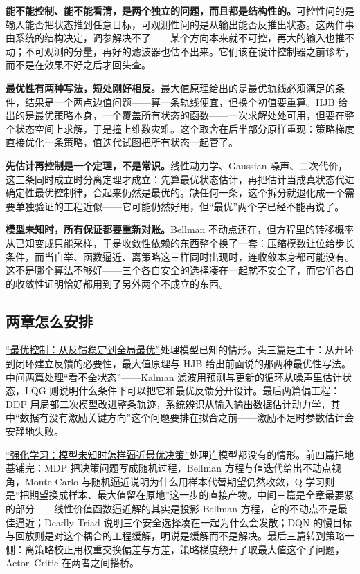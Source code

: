 \textbf{能不能控制、能不能看清，是两个独立的问题，而且都是结构性的。}可控性问的是输入能否把状态推到任意目标，可观测性问的是从输出能否反推出状态。这两件事由系统的结构决定，调参解决不了——某个方向本来就不可控，再大的输入也推不动；不可观测的分量，再好的滤波器也估不出来。它们该在设计控制器之前诊断，而不是在效果不好之后才回头查。

\textbf{最优性有两种写法，短处刚好相反。}最大值原理给出的是最优轨线必须满足的条件，结果是一个两点边值问题——算一条轨线便宜，但换个初值要重算。HJB 给出的是最优策略本身，一个覆盖所有状态的函数——一次求解处处可用，但要在整个状态空间上求解，于是撞上维数灾难。这个取舍在后半部分原样重现：策略梯度直接优化一条策略，值迭代试图把所有状态一起管了。

\textbf{先估计再控制是一个定理，不是常识。}线性动力学、Gaussian 噪声、二次代价，这三条同时成立时分离定理才成立：先算最优状态估计，再把估计当成真状态代进确定性最优控制律，合起来仍然是最优的。缺任何一条，这个拆分就退化成一个需要单独验证的工程近似——它可能仍然好用，但``最优''两个字已经不能再说了。

\textbf{模型未知时，所有保证都要重新对账。}Bellman 不动点还在，但方程里的转移概率从已知变成只能采样，于是收敛性依赖的东西整个换了一套：压缩模数让位给步长条件，而当自举、函数逼近、离策略这三样同时出现时，连收敛本身都可能没有。这不是哪个算法不够好——三个各自安全的选择凑在一起就不安全了，而它们各自的收敛性证明恰好都用到了另外两个不成立的东西。

\subsection{两章怎么安排}

\hyperref[ch:138]{``最优控制：从反馈稳定到全局最优''}处理模型已知的情形。头三篇是主干：从开环到闭环建立反馈的必要性，最大值原理与 HJB 给出前面说的那两种最优性写法。中间两篇处理``看不全状态''——Kalman 滤波用预测与更新的循环从噪声里估计状态，LQG 则说明什么条件下可以把它和最优反馈分开设计。最后两篇偏工程：DDP 用局部二次模型改进整条轨迹，系统辨识从输入输出数据估计动力学，其中``数据有没有激励关键方向''这个问题要排在拟合之前——激励不足时参数估计会安静地失败。

\hyperref[ch:139]{``强化学习：模型未知时怎样逼近最优决策''}处理连模型都没有的情形。前四篇把地基铺完：MDP 把决策问题写成随机过程，Bellman 方程与值迭代给出不动点视角，Monte Carlo 与随机逼近说明为什么用样本代替期望仍然收敛，Q 学习则是``把期望换成样本、最大值留在原地''这一步的直接产物。中间三篇是全章最要紧的部分——线性价值函数逼近解的其实是投影 Bellman 方程，它的不动点不是最佳逼近；Deadly Triad 说明三个安全选择凑在一起为什么会发散；DQN 的慢目标与回放则是对这个耦合的工程缓解，明说是缓解而不是解决。最后三篇转到策略一侧：离策略校正用权重交换偏差与方差，策略梯度绕开了取最大值这个子问题，Actor--Critic 在两者之间搭桥。

